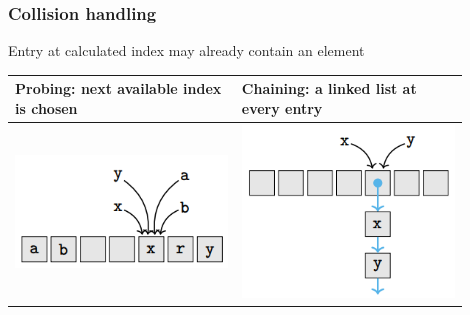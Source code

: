     \subsubsection{Collision handling}
        Entry at calculated index may already contain an element
        \begin{tabular}{p{0.45\linewidth} | p{0.45\linewidth}}
            \hline
            Probing: next available index is chosen & Chaining: a linked list at every entry\\
            \hline
            \includegraphics[width = \linewidth]{src/5_data_structure/images/probing.png} & \includegraphics[width = \linewidth]{src/5_data_structure/images/chaining.png}
        \end{tabular}
